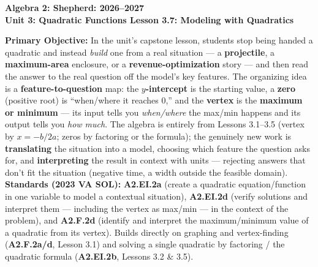 \documentclass[10pt]{article}
\newcommand{\CourseName}{Algebra 2: Shepherd}
\newcommand{\SchoolYear}{2026--2027}
\newcommand{\UnitNumberName}{Unit 3: Quadratic Functions \quad}
\newcommand{\LessonNumberName}{Lesson 3.7: Modeling with Quadratics}
\begin{document}
\begin{center}
    {\Large\bfseries \CourseName: \SchoolYear \\
    {\small\bfseries \UnitNumberName \LessonNumberName}}
\end{center}

\begin{tcolorbox}[colback=forestbg, colframe=forest, boxrule=0.9pt, arc=2mm,
    left=2mm, right=2mm, top=1.5mm, bottom=1.5mm]
    \textbf{Primary Objective:} In the unit's capstone lesson, students stop being handed a quadratic and instead
    \emph{build} one from a real situation --- a \textbf{projectile}, a \textbf{maximum-area} enclosure, or a
    \textbf{revenue-optimization} story --- and then read the answer to the real question off the model's key
    features. The organizing idea is a \textbf{feature-to-question} map: the \textbf{$y$-intercept} is the starting
    value, a \textbf{zero} (positive root) is ``when/where it reaches $0$,'' and the \textbf{vertex} is the
    \textbf{maximum or minimum} --- its input tells you \emph{when/where} the max/min happens and its output tells you
    \emph{how much}. The algebra is entirely from Lessons 3.1--3.5 (vertex by $x=-b/2a$; zeros by factoring or the
    formula); the genuinely new work is \textbf{translating} the situation into a model, choosing which feature the
    question asks for, and \textbf{interpreting} the result in context with units --- rejecting answers that don't fit
    the situation (negative time, a width outside the feasible domain).
    \\[2pt]
    \textbf{Standards (2023 VA SOL):} \textbf{A2.EI.2a} (create a quadratic equation/function in one variable to
    model a contextual situation), \textbf{A2.EI.2d} (verify solutions and interpret them --- including the vertex as
    max/min --- in the context of the problem), and \textbf{A2.F.2d} (identify and interpret the maximum/minimum
    value of a quadratic from its vertex). Builds directly on graphing and vertex-finding (\textbf{A2.F.2a/d}, Lesson
    3.1) and solving a single quadratic by factoring / the quadratic formula (\textbf{A2.EI.2b}, Lessons 3.2 \& 3.5).
\end{tcolorbox}
\end{document}
